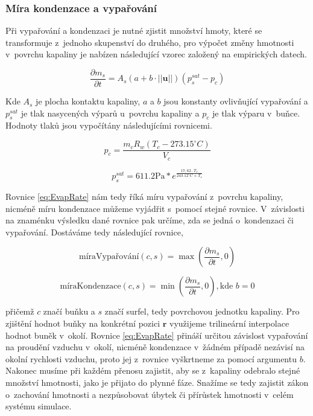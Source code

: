 \subsubsection{Míra kondenzace a vypařování}
Při vypařování a kondenzaci je nutné zjistit množství hmoty, které se transformuje z~jednoho skupenství do druhého, pro výpočet změny hmotnosti v~povrchu kapaliny je nabízen následující vzorec založený na empirických datech. \cite{SMITH94}

\begin{equation}
    \frac{\partial m_s}{\partial t} = A_s(a + b \cdot ||\mathbf{u}||)(p_s^{sat} - p_c)
    \label{eq:EvapRate}
\end{equation}

Kde $A_s$ je plocha kontaktu kapaliny, $a$ a $b$ jsou konstanty ovlivňující vypařování a $p_s^{sat}$ je tlak nasycených výparů u~povrchu kapaliny a $p_c$ je tlak výparu v~buňce. Hodnoty tlaků jsou vypočítány následujícími rovnicemi. \cite{yau1996short}

\begin{equation}
    p_c = \frac{m_c R_w(T_c - 273.15^{\circ}C)}{V_c}
\end{equation}

\begin{equation}
    p_s^{sat} = 611.2\text{Pa} * e^{\frac{17,62 \cdot T_s}{243.12^{\circ}C + T_s}}
\end{equation}

Rovnice \ref{eq:EvapRate} nám tedy říká míru vypařování z~povrchu kapaliny, nicméně míru kondenzace můžeme vyjádřit s~pomocí stejné rovnice. V~závislosti na znaménku výsledku dané rovnice pak určíme, zda se jedná o~kondenzaci či vypařování. Dostáváme tedy následující rovnice,

\begin{equation}
    \text{míraVypařování}(c,s) = \max(\frac{\partial m_s}{\partial t}, 0)
    \label{eq:EvapTrans}
\end{equation}

\begin{equation}
    \text{míraKondenzace}(c,s) = \min(\frac{\partial m_s}{\partial t}, 0), \text{kde } b = 0
    \label{eq:CondTrans}
\end{equation}

přičemž $c$ značí buňku a $s$ značí surfel, tedy povrchovou jednotku kapaliny. Pro zjištění hodnot buňky na konkrétní pozici $\mathbf{r}$ využijeme trilineární interpolace hodnot buněk v~okolí. Rovnice \ref{eq:EvapRate} přináší určitou závislost vypařování na proudění vzduchu v~okolí, nicméně kondenzace v~žádném případě nezávisí na okolní rychlosti vzduchu, proto jej z~rovnice vyškrtneme za pomocí argumentu $b$. Nakonec musíme při každém přenosu zajistit, aby se z~kapaliny odebralo stejné množství hmotnosti, jako je přijato do plynné fáze. Snažíme se tedy zajistit zákon o~zachování hmotnosti a nezpůsobovat úbytek či přírůstek hmotnosti v~celém systému simulace.

